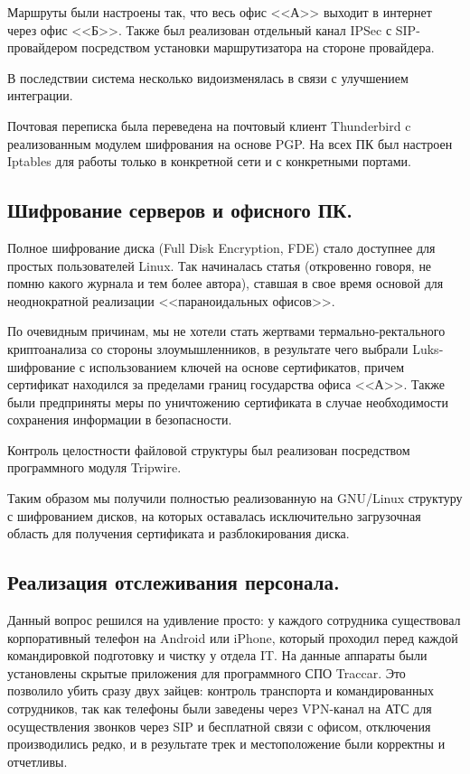 \documentclass[10pt, a5paper]{article}
\begin{document}
Маршруты были настроены так, что весь офис <<А>> выходит в интернет через офис <<Б>>. Также был реализован отдельный канал IPSec с SIP-провайдером посредством установки маршрутизатора на стороне провайдера.

В последствии система несколько видоизменялась в связи с улучшением интеграции.

Почтовая переписка была переведена на почтовый клиент \linebreak Thunderbird c реализованным модулем шифрования на основе PGP. На всех ПК был настроен Iptables для работы только в конкретной сети и с конкретными портами.

\subsection*{Шифрование серверов и офисного ПК.}

Полное шифрование диска (Full Disk Encryption, FDE) стало доступнее для простых пользователей Linux. Так начиналась статья (откровенно говоря, не помню какого журнала и тем более автора), ставшая в свое время основой для неоднократной реализации <<параноидальных офисов>>.

По очевидным причинам, мы не хотели стать жертвами \linebreak термально-ректального криптоанализа со стороны злоумышленников, в результате чего выбрали Luks-шифрование с использованием ключей на основе сертификатов, причем сертификат находился за пределами границ государства офиса <<А>>. Также были предприняты меры по уничтожению сертификата в случае необходимости сохранения информации в безопасности.

Контроль целостности файловой структуры был реализован посредством программного модуля Tripwire.

Таким образом мы получили полностью реализованную на \linebreak GNU/Linux структуру с шифрованием дисков, на которых оставалась исключительно загрузочная область для получения сертификата и разблокирования диска.

\subsection*{Реализация отслеживания персонала.}

Данный вопрос решился на удивление просто: у каждого сотрудника существовал корпоративный телефон на Android или iPhone, который проходил перед каждой командировкой подготовку и чистку у отдела IT. На данные аппараты были установлены скрытые приложения для программного СПО Traccar. Это позволило убить сразу двух зайцев: контроль транспорта и командированных сотрудников, так как телефоны были заведены через VPN-канал на АТС для осуществления звонков через SIP и бесплатной связи с офисом, отключения производились редко, и в результате трек и местоположение были корректны и отчетливы.
\end{document}
